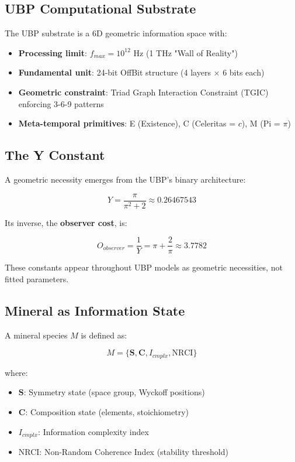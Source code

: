 \documentclass[11pt,a4paper]{article}
\begin{document}
\subsection{UBP Computational Substrate}

The UBP substrate is a 6D geometric information space with:

\begin{itemize}
\item \textbf{Processing limit}: $f_{max} = 10^{12}$ Hz (1 THz "Wall of Reality")
\item \textbf{Fundamental unit}: 24-bit OffBit structure (4 layers $\times$ 6 bits each)
\item \textbf{Geometric constraint}: Triad Graph Interaction Constraint (TGIC) enforcing 3-6-9 patterns
\item \textbf{Meta-temporal primitives}: E (Existence), C (Celeritas = $c$), M (Pi = $\pi$)
\end{itemize}

\subsection{The Y Constant}

A geometric necessity emerges from the UBP's binary architecture:

\begin{equation}
Y = \frac{\pi}{\pi^2 + 2} \approx 0.26467543
\label{eq:Y_constant}
\end{equation}

Its inverse, the \textbf{observer cost}, is:

\begin{equation}
O_{observer} = \frac{1}{Y} = \pi + \frac{2}{\pi} \approx 3.7782
\label{eq:observer}
\end{equation}

These constants appear throughout UBP models as geometric necessities, not fitted parameters.

\subsection{Mineral as Information State}

A mineral species $M$ is defined as:

\begin{equation}
M = \{\mathbf{S}, \mathbf{C}, I_{cmplx}, \text{NRCI}\}
\label{eq:mineral_state}
\end{equation}

where:
\begin{itemize}
\item $\mathbf{S}$: Symmetry state (space group, Wyckoff positions)
\item $\mathbf{C}$: Composition state (elements, stoichiometry)
\item $I_{cmplx}$: Information complexity index
\item NRCI: Non-Random Coherence Index (stability threshold)
\end{itemize}
\end{document}
